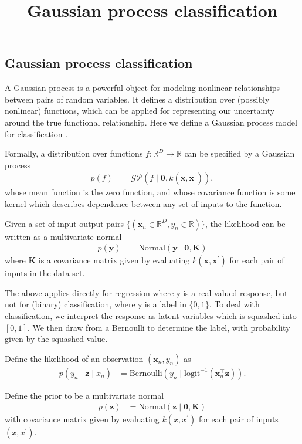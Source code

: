 \title{Gaussian process classification}

\subsection{Gaussian process classification}

A Gaussian process is a powerful object for modeling nonlinear
relationships between pairs of random variables. It defines a distribution over
(possibly nonlinear) functions, which can be applied for representing
our uncertainty around the true functional relationship.
Here we define a Gaussian process model for classification
\citep{rasmussen2006gaussian}.

Formally, a distribution over functions $f:\mathbb{R}^D\to\mathbb{R}$ can be specified
by a Gaussian process
\begin{align*}
  p(f)
  &=
  \mathcal{GP}(f\mid \mathbf{0}, k(\mathbf{x}, \mathbf{x}^\prime)),
\end{align*}
whose mean function is the zero function, and whose covariance
function is some kernel which describes dependence between
any set of inputs to the function.

Given a set of input-output pairs
$\{(\mathbf{x}_n\in\mathbb{R}^D,y_n\in\mathbb{R})\}$,
the likelihood can be written as a multivariate normal
\begin{align*}
  p(\mathbf{y})
  &=
  \text{Normal}(\mathbf{y} \mid \mathbf{0}, \mathbf{K})
\end{align*}
where $\mathbf{K}$ is a covariance matrix given by evaluating
$k(\mathbf{x}, \mathbf{x}^\prime)$ for each pair of inputs in the data
set.

The above applies directly for regression where $\mathbb{y}$ is a
real-valued response, but not for (binary) classification, where $\mathbb{y}$
is a label in $\{0,1\}$. To deal with classification, we interpret the
response as latent variables which is squashed into $[0,1]$. We then
draw from a Bernoulli to determine the label, with probability given
by the squashed value.

Define the likelihood of an observation $(\mathbf{x}_n, y_n)$ as
\begin{align*}
  p(y_n \mid \mathbf{z} \mid x_n)
  &=
  \text{Bernoulli}(y_n \mid \text{logit}^{-1}(\mathbf{x}_n^\top \mathbf{z})).
\end{align*}

Define the prior to be a multivariate normal
\begin{align*}
  p(\mathbf{z})
  &=
  \text{Normal}(\mathbf{z} \mid \mathbf{0}, \mathbf{K})
\end{align*}
with
covariance matrix given by evaluating $k(x, x^\prime)$ for each pair of inputs
$(x, x^\prime)$.


